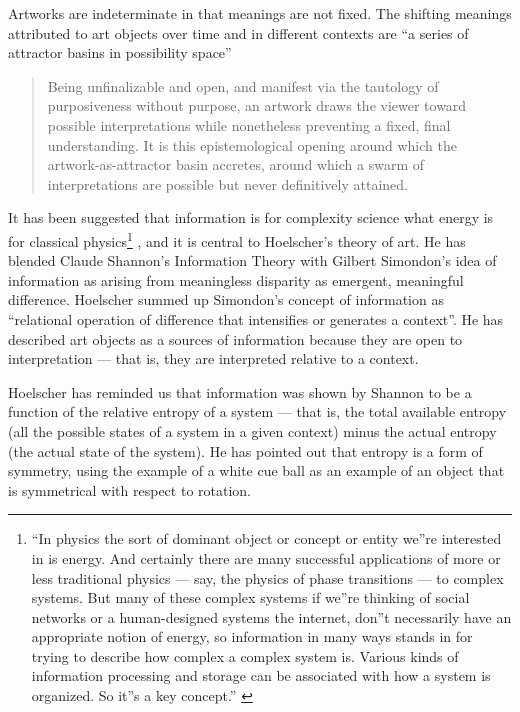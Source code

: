 \documentclass[letterpaper]{article}
\begin{document}
    Artworks are indeterminate in that meanings are not fixed. The shifting meanings attributed to art objects over time and in different contexts are “a series of attractor basins in possibility space” \citep[p.4]{HoelscherThPtcsOfPhsSpc2014}
    
    \begin{quote}
        Being unfinalizable and open, and manifest via the tautology of purposiveness without purpose, an artwork draws the viewer toward possible interpretations while nonetheless preventing a fixed, final understanding. It is this epistemological opening around which the artwork-as-attractor basin accretes, around which a swarm of interpretations are possible but never definitively attained. \citep[p.12]{HoelscherThPtcsOfPhsSpc2014}
    \end{quote}

    It has been suggested that information is for complexity science what energy is for classical physics\footnote{
        “In physics the sort of dominant object or concept or entity we”re interested in is energy. And certainly there are many successful applications of more or less traditional physics — say, the physics of phase transitions — to complex systems. But many of these complex systems if we”re thinking of social networks or a human-designed systems the internet, don”t necessarily have an appropriate notion of energy, so information in many ways stands in for trying to describe how complex a complex system is. Various kinds of information processing and storage can be associated with how a system is organized.  So it”s a key concept.” \citep[0:52]{CrutchfieldIntrdctnToCmplxty2018}
    } \citep{CrutfieldRtAlSgntrsOfInfnty2015}, and it is central to Hoelscher's theory of art. He has blended Claude Shannon's Information Theory with Gilbert Simondon's idea of information as arising from meaningless disparity as emergent, meaningful difference. Hoelscher summed up Simondon's concept of information as “relational operation of difference that intensifies or generates a context”. He has described art objects as a sources of information because they are open to interpretation — that is, they are interpreted relative to a context. 
    
    Hoelscher has reminded us that information was shown by Shannon to be a function of the relative entropy of a system — that is, the total available entropy (all the possible states of a system in a given context) minus the actual entropy (the actual state of the system). He has pointed out that entropy is a form of symmetry, using the example of a white cue ball as an example of an object that is symmetrical with respect to rotation.
    
\end{document}
